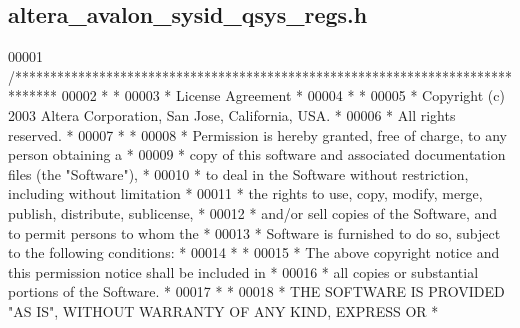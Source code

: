 \subsection{altera\+\_\+avalon\+\_\+sysid\+\_\+qsys\+\_\+regs.\+h}
\label{altera__avalon__sysid__qsys__regs_8h_source}

\begin{DoxyCode}
00001 \textcolor{comment}{/******************************************************************************}
00002 \textcolor{comment}{*                                                                             *}
00003 \textcolor{comment}{* License Agreement                                                           *}
00004 \textcolor{comment}{*                                                                             *}
00005 \textcolor{comment}{* Copyright (c) 2003 Altera Corporation, San Jose, California, USA.           *}
00006 \textcolor{comment}{* All rights reserved.                                                        *}
00007 \textcolor{comment}{*                                                                             *}
00008 \textcolor{comment}{* Permission is hereby granted, free of charge, to any person obtaining a     *}
00009 \textcolor{comment}{* copy of this software and associated documentation files (the "Software"),  *}
00010 \textcolor{comment}{* to deal in the Software without restriction, including without limitation   *}
00011 \textcolor{comment}{* the rights to use, copy, modify, merge, publish, distribute, sublicense,    *}
00012 \textcolor{comment}{* and/or sell copies of the Software, and to permit persons to whom the       *}
00013 \textcolor{comment}{* Software is furnished to do so, subject to the following conditions:        *}
00014 \textcolor{comment}{*                                                                             *}
00015 \textcolor{comment}{* The above copyright notice and this permission notice shall be included in  *}
00016 \textcolor{comment}{* all copies or substantial portions of the Software.                         *}
00017 \textcolor{comment}{*                                                                             *}
00018 \textcolor{comment}{* THE SOFTWARE IS PROVIDED "AS IS", WITHOUT WARRANTY OF ANY KIND, EXPRESS OR  *}

\end{DoxyCode}
